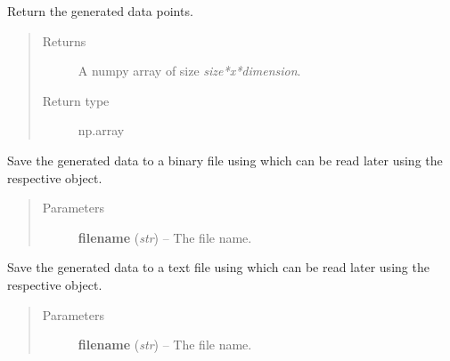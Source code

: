 \documentclass[letterpaper,10pt,english]{sphinxmanual}
\begin{document}
\begin{fulllineitems}
\begin{fulllineitems}
\label{kmeans:kmeans_data_generator.KmeansRandomDataGenerator.get_data}
Return the generated data points.
\begin{quote}\begin{description}
\item[{Returns}] \leavevmode
A numpy array of size \emph{size*x*dimension}.

\item[{Return type}] \leavevmode
np.array

\end{description}\end{quote}

\end{fulllineitems}


\begin{fulllineitems}
\label{kmeans:kmeans_data_generator.KmeansRandomDataGenerator.to_binary_file}
Save the generated data to a binary file using  which can be read later using the
respective {\hyperref[common:common_data_importer.CommonDataImporter]{}} object.
\begin{quote}\begin{description}
\item[{Parameters}] \leavevmode
\textbf{filename} (\emph{str}) -- The file name.

\end{description}\end{quote}

\end{fulllineitems}


\begin{fulllineitems}
\label{kmeans:kmeans_data_generator.KmeansRandomDataGenerator.to_file}
Save the generated data to a text file using  which can be read later using the
respective {\hyperref[common:common_data_importer.CommonDataImporter]{}} object.
\begin{quote}\begin{description}
\item[{Parameters}] \leavevmode
\textbf{filename} (\emph{str}) -- The file name.

\end{description}\end{quote}

\end{fulllineitems}


\end{fulllineitems}
\end{document}
